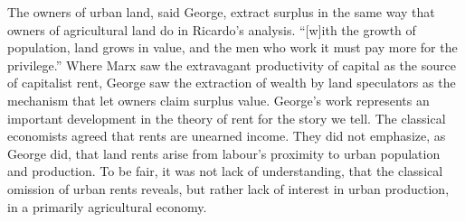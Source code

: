 The owners of urban land,  said George,  extract surplus in the same way that owners of agricultural land do in Ricardo's analysis. ``[w]ith the growth of population, land grows in value, and the men who work it must pay more for the privilege.''  Where Marx saw the extravagant productivity of capital as the source of capitalist rent, George saw the extraction of wealth by land speculators as the mechanism that let owners claim surplus value. George's work represents an important development in the theory of rent for the story we tell. The classical economists agreed that rents are unearned income. They did not emphasize, as George did, that land rents arise from labour's proximity to urban population and production. To be fair, it was not lack of understanding, that the classical omission of urban rents reveals, but rather lack of interest in urban production, in a primarily agricultural economy.





